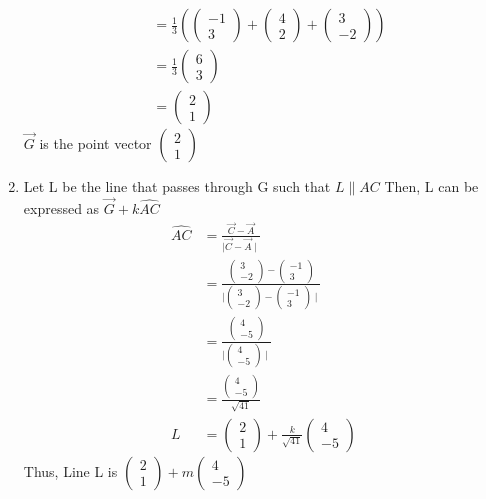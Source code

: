 \documentclass[12pt, a4paper,twocolumn]{article}
\newcommand{\myvec}[1]{\ensuremath{\begin{pmatrix}#1\end{pmatrix}}}
\begin{document}
\begin{enumerate}
\begin{align*}
        \\
        &= \frac{1}{3}(\myvec{-1 \\ 3} + \myvec{4 \\ 2} + \myvec{3 \\ -2})
        \\
        &=\frac{1}{3}\myvec{6 \\ 3}
        \\
        &= \myvec{2 \\ 1}
    \end{align*}
    $\vec{G}$ is the point vector $\myvec{2 \\ 1}$
\item Let L be the line that passes through G such that $L \parallel AC$
    Then, L can be expressed as $\vec{G} + k\hat{AC}$
    \begin{align*}
        \hat{AC} &= \frac{\vec{C} - \vec{A}}{\mid \vec{C} - \vec{A} \mid}
		\\        
        &= \frac{\myvec{3 \\ -2} - \myvec{-1 \\ 3}}{\mid \myvec{3 \\ -2} - \myvec{-1 \\ 3} \mid}
        \\
        &= \frac{\myvec{4 \\ -5}}{\mid \myvec{4 \\ -5} \mid}
		\\        
        &= \frac{\myvec{4 \\ -5}}{\sqrt{41}}
        \\
        L &= \myvec{2 \\ 1} + \frac{k}{\sqrt{41}}\myvec{4 \\ -5}
    \end{align*}
    Thus, Line L is $\myvec{2 \\ 1} + m\myvec{4 \\ -5}$
\end{enumerate}
\end{document}
